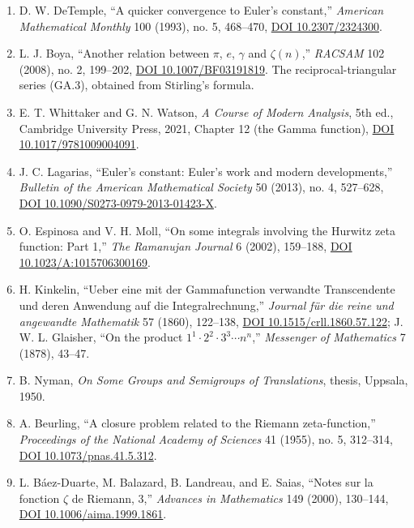\documentclass[
  11pt,
]{book}
\begin{document}
\begin{enumerate}
{  10.1016/j.amc.2017.08.053}.
\item
  D. W. DeTemple, ``A quicker convergence to Euler's constant,''
  \emph{American Mathematical Monthly} 100 (1993), no. 5, 468--470,
  \href{https://doi.org/10.2307/2324300}{DOI 10.2307/2324300}.
\item
  L. J. Boya, ``Another relation between \(\pi\), \(e\), \(\gamma\) and
  \(\zeta(n)\),'' \emph{RACSAM} 102 (2008), no. 2, 199--202,
  \href{https://doi.org/10.1007/BF03191819}{DOI 10.1007/BF03191819}. The
  reciprocal-triangular series (GA.3), obtained from Stirling's formula.
\item
  E. T. Whittaker and G. N. Watson, \emph{A Course of Modern Analysis},
  5th ed., Cambridge University Press, 2021, Chapter 12 (the Gamma
  function), \href{https://doi.org/10.1017/9781009004091}{DOI
  10.1017/9781009004091}.
\item
  J. C. Lagarias, ``Euler's constant: Euler's work and modern
  developments,'' \emph{Bulletin of the American Mathematical Society}
  50 (2013), no. 4, 527--628,
  \href{https://doi.org/10.1090/S0273-0979-2013-01423-X}{DOI
  10.1090/S0273-0979-2013-01423-X}.
\item
  O. Espinosa and V. H. Moll, ``On some integrals involving the Hurwitz
  zeta function: Part 1,'' \emph{The Ramanujan Journal} 6 (2002),
  159--188, \href{https://doi.org/10.1023/A:1015706300169}{DOI
  10.1023/A:1015706300169}.
\item
  H. Kinkelin, ``Ueber eine mit der Gammafunction verwandte
  Transcendente und deren Anwendung auf die Integralrechnung,''
  \emph{Journal für die reine und angewandte Mathematik} 57 (1860),
  122--138, \href{https://doi.org/10.1515/crll.1860.57.122}{DOI
  10.1515/crll.1860.57.122}; J. W. L. Glaisher, ``On the product
  \(1^1\cdot2^2\cdot3^3\cdots n^n\),'' \emph{Messenger of Mathematics} 7
  (1878), 43--47.
\item
  B. Nyman, \emph{On Some Groups and Semigroups of Translations},
  thesis, Uppsala, 1950.
\item
  A. Beurling, ``A closure problem related to the Riemann
  zeta-function,'' \emph{Proceedings of the National Academy of
  Sciences} 41 (1955), no. 5, 312--314,
  \href{https://doi.org/10.1073/pnas.41.5.312}{DOI
  10.1073/pnas.41.5.312}.
\item
  L. Báez-Duarte, M. Balazard, B. Landreau, and E. Saias, ``Notes sur la
  fonction \(\zeta\) de Riemann, 3,'' \emph{Advances in Mathematics} 149
  (2000), 130--144, \href{https://doi.org/10.1006/aima.1999.1861}{DOI
  10.1006/aima.1999.1861}.

\end{enumerate}
\end{document}
